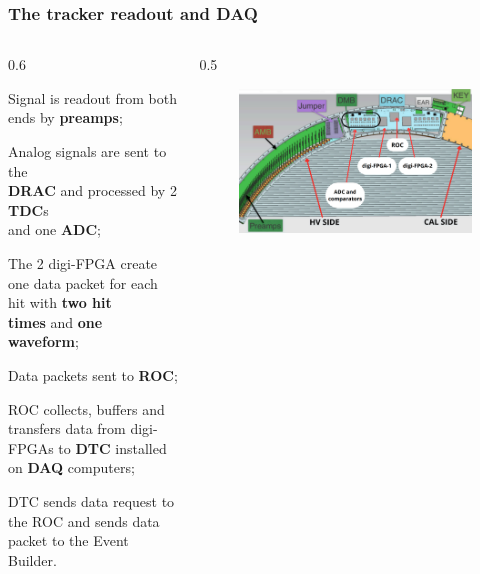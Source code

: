 \documentclass{beamer}
\begin{document}
\begin{frame}
    \frametitle{The tracker readout and DAQ}
    \vspace{-6mm}
    \begin{columns}
         \begin{column}{0.6\framewidth}
         \setlength{\leftmargini}{1em}
         \begin{itemize}
         {\small
         \item Signal is readout from both ends by  \textbf{preamps};
         \vspace{2mm}
         \item Analog signals are sent to the \\ \textbf{DRAC} and processed by 2 \textbf{TDC}s \\ and one \textbf{ADC};
         \vspace{2mm}
        \item The 2 digi-FPGA create one data packet for each hit with \textbf{two hit} \\ \textbf{times} and \textbf{one waveform};
        \vspace{2mm}
        \item Data packets sent to \textbf{ROC};
        \vspace{2mm}
        \item ROC collects, buffers and transfers data from digi-FPGAs to \textbf{DTC} installed on \textbf{DAQ} computers;
        \vspace{2mm}
        \item DTC sends data request to the ROC and sends data packet to the Event Builder.}
         \end{itemize}
    \end{column}
    \begin{column}{0.5\framewidth}
           \begin{figure}[h]
          \centering
                    \hspace*{-1.2em}
            \includegraphics[width=1.1\columnwidth]{figures/png/Screenshot_20240919_110354.png}

\end{figure}
\end{column}
\end{columns}
\end{frame}
\end{document}
